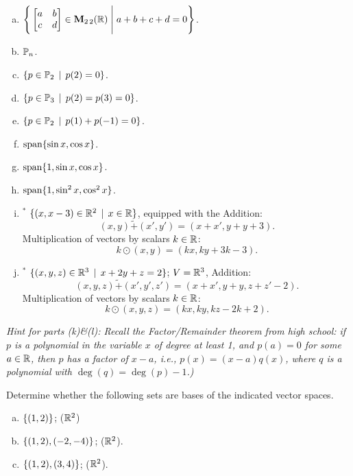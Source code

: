 \begin{prob}
\begin{enumerate}[a)]
\item  $\Bigg\{  \bmatrix a&b\\ c&d\endbmatrix \in \M_{2 \,2}(\R) \;\Bigg|\; a+b+c+d=0\Bigg\}$.      \medskip
%
\item\sov  $ \mathbb{P}_n $.  \medskip
%
\item  $ \{p \in \mathbb{P}_2 \,\mid \,  p(2)=0 \}$.  \medskip
%

\item\sov  $ \{p \in \mathbb{P}_3 \,\mid \,  p(2)=p(3)=0 \}$.  \medskip
%


\item  $ \{p \in \mathbb{P}_2 \,\mid \,  p(1)+p(-1)=0 \}$.      \medskip
%
\item\sov  $ \textrm{span}\{\sin x, \cos x\}$.      \medskip
%
\item  $ \textrm{span}\{1, \sin x, \cos x\}$.      \medskip
%
 \item\sov  $ \textrm{span}\{1, \sin^2 x, \cos^2 x\}$.      \medskip
%

\item$^\ast$  $\{(x, x-3) \in \mathbb{R}^2\,\mid \, x\in \mathbb{R} \}$,  equipped with the  Addition: $$(x,y) \tilde+ (x',y')=(x+x', y+y +3).$$ Multiplication of vectors  by  scalars $k\in \mathbb{R}$: 
$$k \odot (x,y)=(kx, ky+3k-3).$$    
%
\item$^\ast$  $\{(x, y, z) \in \mathbb{R}^3\,\mid \, x+2y+z=2  \}$; $V=\mathbb{R}^3$,  Addition: $$(x,y,z) \tilde+ (x',y',z')=(x+x', y+y,z+z'-2).$$ Multiplication of vectors  by  scalars $k\in \mathbb{R}$: $$k\odot (x,y,z)=(kx, ky, kz-2k+2).$$\medskip 
%
\end{enumerate}
\emph{Hint for parts (k)\&(l): Recall the Factor/Remainder theorem from high school: if $p$ is a  polynomial in the variable $x$ of degree at least 1,  and $p(a)=0$ for some $a \in \mathbb{R}$, then $p$ has a factor of $x-a$, i.e., $p(x)=(x-a)q(x)$, where $q$ is a polynomial with $\deg(q)=\deg(p)-1$.)}



\end{prob} \begin{prob} \label{prob09.2} Determine whether   the following  sets are bases of the indicated vector spaces.  
  
\begin{enumerate}[a)]
\medskip
\item  $\{(1,2) \} $; ($\mathbb{R}^2$) \medskip
\item\sov $\{(1,2), (-2,-4) \} $; ($\mathbb{R}^2$).\medskip

\item $\{(1,2), (3,4) \} $; ($\mathbb{R}^2$).\medskip


\end{enumerate}
\end{prob}
